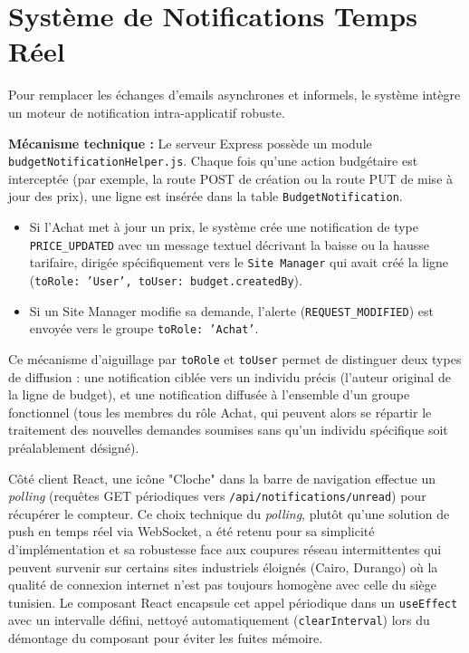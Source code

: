 \section{Système de Notifications Temps Réel}
\label{sec:notifications_temps_reel}
Pour remplacer les échanges d'emails asynchrones et informels, le système intègre un moteur de notification intra-applicatif robuste.

\textbf{Mécanisme technique :}
Le serveur Express possède un module \texttt{budgetNotificationHelper.js}. Chaque fois qu'une action budgétaire est interceptée (par exemple, la route POST de création ou la route PUT de mise à jour des prix), une ligne est insérée dans la table \texttt{BudgetNotification}.
\begin{itemize}
    \item Si l'Achat met à jour un prix, le système crée une notification de type \texttt{PRICE\_UPDATED} avec un message textuel décrivant la baisse ou la hausse tarifaire, dirigée spécifiquement vers le \texttt{Site Manager} qui avait créé la ligne (\texttt{toRole: 'User', toUser: budget.createdBy}).
    \item Si un Site Manager modifie sa demande, l'alerte (\texttt{REQUEST\_MODIFIED}) est envoyée vers le groupe \texttt{toRole: 'Achat'}.
\end{itemize}

Ce mécanisme d'aiguillage par \texttt{toRole} et \texttt{toUser} permet de distinguer deux types de diffusion : une notification ciblée vers un individu précis (l'auteur original de la ligne de budget), et une notification diffusée à l'ensemble d'un groupe fonctionnel (tous les membres du rôle Achat, qui peuvent alors se répartir le traitement des nouvelles demandes soumises sans qu'un individu spécifique soit préalablement désigné).

Côté client React, une icône "Cloche" dans la barre de navigation effectue un \textit{polling} (requêtes GET périodiques vers \texttt{/api/notifications/unread}) pour récupérer le compteur. Ce choix technique du \textit{polling}, plutôt qu'une solution de push en temps réel via WebSocket, a été retenu pour sa simplicité d'implémentation et sa robustesse face aux coupures réseau intermittentes qui peuvent survenir sur certains sites industriels éloignés (Cairo, Durango) où la qualité de connexion internet n'est pas toujours homogène avec celle du siège tunisien. Le composant React encapsule cet appel périodique dans un \texttt{useEffect} avec un intervalle défini, nettoyé automatiquement (\texttt{clearInterval}) lors du démontage du composant pour éviter les fuites mémoire.

